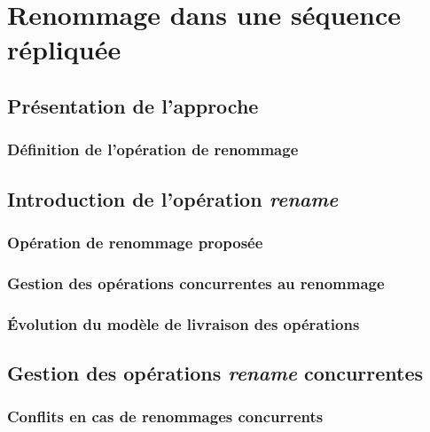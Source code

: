 \NumberThisInToc
\chapter{Renommage dans une séquence répliquée}
\minitoc
\label{chap:renamablelogootsplit}

\section{Présentation de l'approche}


\subsection{Définition de l'opération de renommage}


\section{Introduction de l'opération \emph{rename}}
\label{sec:centralised-rls}

\subsection{Opération de renommage proposée}


\subsection{Gestion des opérations concurrentes au renommage}


\subsection{Évolution du modèle de livraison des opérations}


\section{Gestion des opérations \emph{rename} concurrentes}
\label{sec:distributed-rls}

\subsection{Conflits en cas de renommages concurrents}


